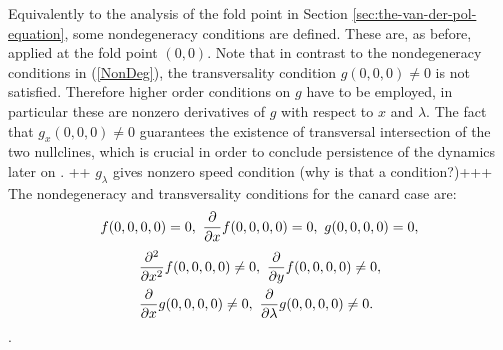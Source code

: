 Equivalently to the analysis of the fold point in Section \ref{sec:the-van-der-pol-equation}, some nondegeneracy conditions are defined.
These are, as before, applied at the fold point $(0,0)$. Note that in contrast to the nondegeneracy conditions in (\ref{NonDeg}), the transversality condition $g(0,0,0) \neq 0$ is not satisfied. Therefore higher order conditions on $g$ have to be employed, in particular these are nonzero derivatives of $g$ with respect to $x$ and $\lambda$. The fact that $g_x(0,0,0) \neq 0$ guarantees the existence of transversal intersection of the two nullclines, which is crucial in order to conclude persistence of the dynamics later on \citep{kuehn}. ++ $g_\lambda$ gives nonzero speed condition (why is that a condition?)+++
The nondegeneracy and transversality conditions for the canard case are:
\begin{equation}
f(0,0,0,0)=0, \ \pd{}{x}f(0,0,0,0)=0, \ g(0,0,0,0)=0, \label{eq: canard sing condition}
\end{equation}
\begin{equation}
\begin{aligned}
&\pd{^2}{x^2}f(0,0,0,0)\neq 0, \ \pd{}{y}f(0,0,0,0)\neq 0,\\
&\pd{}{x}g(0,0,0,0)\neq 0, \ \pd{}{\lambda}g(0,0,0,0)\neq 0. \label{eq: canard non-d condition}
\end{aligned}
\end{equation}
 \citep{krupa2001}. 


